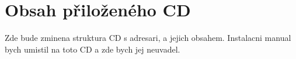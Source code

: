 \chapter{Obsah přiloženého CD}
Zde bude zminena struktura CD s adresari, a jejich obsahem.
Instalacni manual bych umistil na toto CD a zde bych jej neuvadel.
